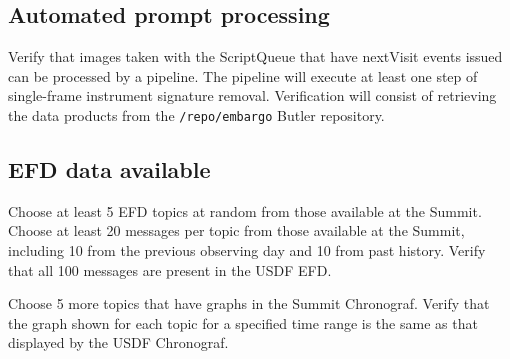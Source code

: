 \subsection{Automated prompt processing}
Verify that images taken with the ScriptQueue that have nextVisit events issued can be processed by a pipeline.
The pipeline will execute at least one step of single-frame instrument signature removal.
Verification will consist of retrieving the data products from the \texttt{/repo/embargo} Butler repository.

\subsection{EFD data available }
Choose at least 5 EFD topics at random from those available at the Summit.
Choose at least 20 messages per topic from those available at the Summit, including 10 from the previous observing day and 10 from past history.
Verify that all 100 messages are present in the USDF EFD.

Choose 5 more topics that have graphs in the Summit Chronograf.
Verify that the graph shown for each topic for a specified time range is the same as that displayed by the USDF Chronograf.
